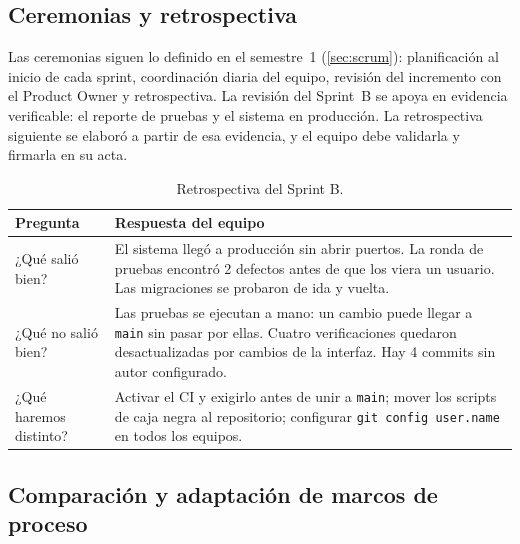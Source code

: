 \subsection{Ceremonias y retrospectiva}

Las ceremonias siguen lo definido en el semestre~1 (\cref{sec:scrum}): planificación al
inicio de cada sprint, coordinación diaria del equipo, revisión del incremento con el Product
Owner y retrospectiva. La revisión del Sprint~B se apoya en evidencia verificable: el reporte
de pruebas y el sistema en producción. La retrospectiva siguiente se elaboró a partir de esa
evidencia, y el equipo debe validarla y firmarla en su acta.

\begin{table}[H]
\centering
\caption{Retrospectiva del Sprint B.}
\label{tab:ce02-e4-retro}
\small
\begin{tabularx}{\textwidth}{L{3cm}X}
\toprule
\textbf{Pregunta} & \textbf{Respuesta del equipo} \\
\midrule
¿Qué salió bien? & El sistema llegó a producción sin abrir puertos. La ronda de pruebas encontró 2 defectos antes de que los viera un usuario. Las migraciones se probaron de ida y vuelta. \\
¿Qué no salió bien? & Las pruebas se ejecutan a mano: un cambio puede llegar a \texttt{main} sin pasar por ellas. Cuatro verificaciones quedaron desactualizadas por cambios de la interfaz. Hay 4 commits sin autor configurado. \\
¿Qué haremos distinto? & Activar el CI y exigirlo antes de unir a \texttt{main}; mover los scripts de caja negra al repositorio; configurar \texttt{git config user.name} en todos los equipos. \\
\bottomrule
\end{tabularx}
\end{table}

\subsection{Comparación y adaptación de marcos de proceso}

